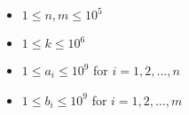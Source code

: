 \begin{itemize}
\tightlist
\item $1 \leq n, m \leq 10^5$
\item $1 \leq k \leq 10^6$
\item $1 \leq a_i \leq 10^9$ for $i = 1, 2, \ldots, n$
\item $1 \leq b_i \leq 10^9$ for $i = 1, 2, \ldots, m$
\end{itemize}
